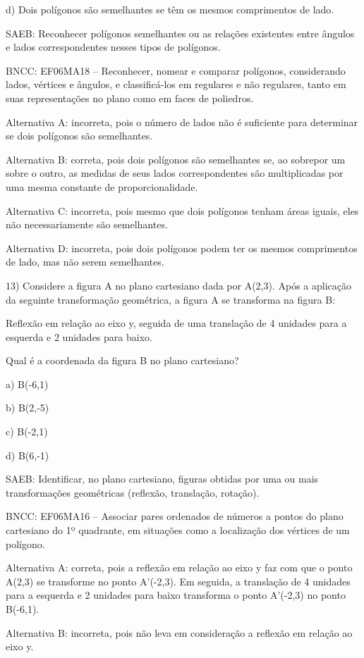 d) Dois polígonos são semelhantes se têm os mesmos comprimentos de lado.

SAEB: Reconhecer polígonos semelhantes ou as relações existentes entre
ângulos e lados correspondentes nesses tipos de polígonos.

BNCC: EF06MA18 -- Reconhecer, nomear e comparar polígonos, considerando
lados, vértices e ângulos, e classificá-los em regulares e não
regulares, tanto em suas representações no plano como em faces de
poliedros.

Alternativa A: incorreta, pois o número de lados não é suficiente para
determinar se dois polígonos são semelhantes.

Alternativa B: correta, pois dois polígonos são semelhantes se, ao
sobrepor um sobre o outro, as medidas de seus lados correspondentes são
multiplicadas por uma mesma constante de proporcionalidade.

Alternativa C: incorreta, pois mesmo que dois polígonos tenham áreas
iguais, eles não necessariamente são semelhantes.

Alternativa D: incorreta, pois dois polígonos podem ter os mesmos
comprimentos de lado, mas não serem semelhantes.

13) Considere a figura A no plano cartesiano dada por A(2,3). Após a
aplicação da seguinte transformação geométrica, a figura A se transforma
na figura B:

Reflexão em relação ao eixo y, seguida de uma translação de 4 unidades
para a esquerda e 2 unidades para baixo.

Qual é a coordenada da figura B no plano cartesiano?

a) B(-6,1)

b) B(2,-5)

c) B(-2,1)

d) B(6,-1)

SAEB: Identificar, no plano cartesiano, figuras obtidas por uma ou mais
transformações geométricas (reflexão, translação, rotação).

BNCC: EF06MA16 -- Associar pares ordenados de números a pontos do plano
cartesiano do 1º quadrante, em situações como a localização dos vértices
de um polígono.

Alternativa A: correta, pois a reflexão em relação ao eixo y faz com que
o ponto A(2,3) se transforme no ponto A'(-2,3). Em seguida, a translação
de 4 unidades para a esquerda e 2 unidades para baixo transforma o ponto
A'(-2,3) no ponto B(-6,1).

Alternativa B: incorreta, pois não leva em consideração a reflexão em
relação ao eixo y.

